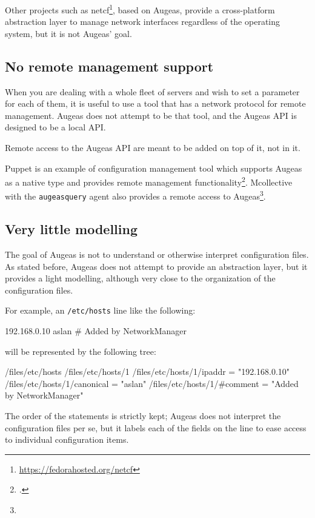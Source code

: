 Other projects such as netcf\footnote{\url{https://fedorahosted.org/netcf}}, based on Augeas, provide a cross-platform abstraction layer to manage network interfaces regardless of the operating system, but it is not Augeas' goal.

\subsection{No remote management support}

When you are dealing with a whole fleet of servers and wish to set a parameter for each of them, it is useful to use a tool that has a network protocol for remote management. Augeas does not attempt to be that tool, and the Augeas API is designed to be a local API.

Remote access to the Augeas API are meant to be added on top of it, not in it.

Puppet is an example of configuration management tool which supports Augeas as a native type and provides remote management functionality\footnote{.}. Mcollective with the \texttt{augeasquery} agent also provides a remote access to Augeas\footnote{}.

\subsection{Very little modelling}

The goal of Augeas is not to understand or otherwise interpret configuration files. As stated before, Augeas does not attempt to provide an abstraction layer, but it provides a light modelling, although very close to the organization of the configuration files.

For example, an \nolinkurl{/etc/hosts} line like the following:

\begin{bash}[]
192.168.0.10    aslan   # Added by NetworkManager
\end{bash}

will be represented by the following tree:

\begin{augtoolsh}[]
/files/etc/hosts
/files/etc/hosts/1
/files/etc/hosts/1/ipaddr = "192.168.0.10"
/files/etc/hosts/1/canonical = "aslan"
/files/etc/hosts/1/#comment = "Added by NetworkManager"
\end{augtoolsh}

The order of the statements is strictly kept; Augeas does not interpret the configuration files per se, but it labels each of the fields on the line to ease access to individual configuration items.


